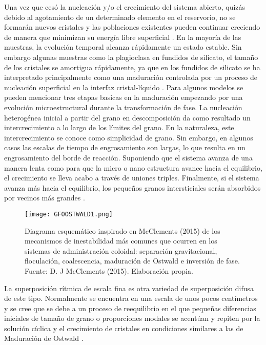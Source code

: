 \documentclass[3pt,twocolumn]{elsarticle}
\begin{document}
Una vez que cesó la nucleación y/o el crecimiento del sistema abierto, quizás debido al agotamiento de un determinado elemento en el reservorio, no se formarán nuevos cristales y las poblaciones existentes pueden continuar creciendo de manera que minimizan su energía libre superficial \cite{a2}.
En la mayoría de las muestras, la evolución temporal alcanza rápidamente un estado estable. Sin embargo algunas muestras como la plagioclasa en fundidos de silicato, el tamaño de los cristales se amortigua rápidamente, ya que en los fundidos de silicato se ha interpretado principalmente como una maduración controlada por un proceso de nucleación superficial en la interfaz cristal-líquido \cite{a3}.
Para algunos modelos se pueden mencionar tres etapas basicas en la maduración empezando por una evolución microestructural durante la transformación de fase. La nucleación heterogénea inicial a partir del grano en descomposición da como resultado un intercrecimiento a lo largo de los límites del grano. En la naturaleza, este intercrecimiento se conoce como simplicidad de grano. Sin embargo, en algunos casos las escalas de tiempo de engrosamiento son largas, lo que resulta en un engrosamiento del borde de reacción. Suponiendo que el sistema avanza de una manera lenta como para que la micro o nano estructura avance hacia el equilibrio, el crecimiento se lleva acabo a través de uniones triples. Finalmente, si el sistema avanza más hacia el equilibrio, los pequeños granos intersticiales serán absorbidos por vecinos más grandes
\cite{a5}.
	\begin{figure}[h!]
				\centering
				\texttt{[image: GFOOSTWALD1.png]} %
				\caption{Diagrama esquemático inspirado en McClements (2015) \cite{a1} de los mecanismos de inestabilidad más comunes que ocurren en los sistemas de administración coloidal: separación gravitacional, floculación, coalescencia, maduración de Ostwald e inversión de fase.\\
				Fuente: D. J McClements (2015).
				Elaboración propia.}
		\label{ostwlad}
\end{figure}

La superposición rítmica de escala fina es otra variedad de superposición difusa de este tipo. Normalmente se encuentra en una escala de unos pocos centímetros y se cree que se debe a un proceso de reequilibrio en el que pequeñas diferencias iniciales de tamaño de grano o proporciones modales se acentúan y repiten por la solución cíclica y el crecimiento de cristales en condiciones similares a las de Maduración de Ostwald
\cite{a6}.
\end{document}
